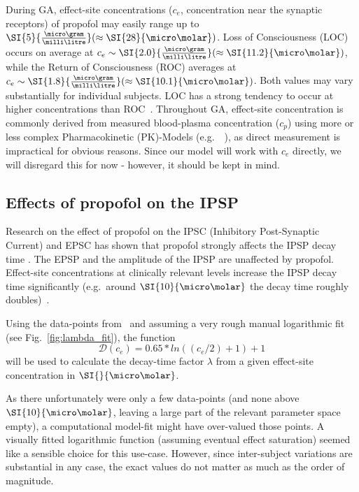 During GA, effect-site concentrations ($c_{e}$, concentration near the synaptic receptors) of propofol may easily range
up to
$\SI{5}{\frac{\micro\gram}{\milli\litre}} (\approx\SI{28}{\micro\molar})$.
Loss of Consciousness (LOC) occurs on average at $c_e \sim\SI{2.0}{\frac{\micro\gram}{\milli\litre}} (\approx\SI{11
.2}{\micro\molar})$,
while the Return of Consciousness (ROC) averages at $c_e \sim\SI{1.8}{\frac{\micro\gram}{\milli\litre}}
(\approx\SI{10.1}{\micro\molar})$.
Both values may vary substantially for individual subjects.
LOC has a strong tendency to occur at higher concentrations than ROC~\cite{iwakiri_individual_2005,
    ferreira_patterns_2020}.
Throughout GA, effect-site concentration is commonly derived from measured
blood-plasma concentration ($c_p$) using more or less complex Pharmacokinetic (PK)-Models
(e.g.\ ~\cite{eleveld_general_2014, liang_pharmacokinetics-neural_2015}),
as direct measurement is impractical for obvious reasons.
Since our model will work with $c_{e}$ directly, we will disregard this for now - however, it should be kept in mind.


\subsection{Effects of propofol on the IPSP}

Research on the effect of propofol on the IPSC (Inhibitory Post-Synaptic Current) and EPSC
has shown that propofol strongly affects the IPSP decay time \cite{kitamura_effects_2003, mcdougall_propofol_2008}.
The EPSP and the amplitude of the IPSP are unaffected by propofol.
Effect-site concentrations at clinically relevant levels increase the IPSP decay time
significantly (e.g.\ around $\SI{10}{\micro\molar}$ the decay time roughly doubles)~\cite{kitamura_effects_2003}.

Using the data-points from~\cite{kitamura_effects_2003}
and assuming a very rough manual logarithmic fit (see Fig.~\ref{fig:lambda_fit}),
the function
        \[ \mathscr{D}(c_{e}) = 0.65*ln((c_{e}/2)+1)+1 \]
will be used to calculate the decay-time factor $\lambda$ from a given
effect-site concentration in $\SI{}{\micro\molar}$.

As there unfortunately were only a few data-points (and none above $\SI{10}{\micro\molar}$,
leaving a large part of the relevant parameter space empty),
a computational model-fit might have over-valued those points.
A visually fitted logarithmic function (assuming eventual effect saturation) seemed like a sensible choice
for this use-case.
However, since inter-subject variations are substantial in any case,
the exact values do not matter as much as the order of magnitude.


